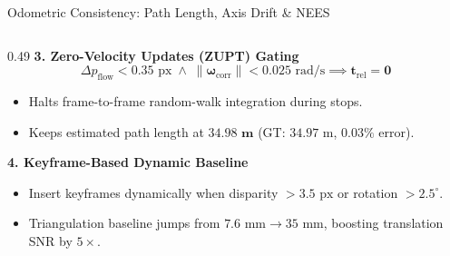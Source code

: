 \documentclass[aspectratio=169, 10pt]{beamer}
\begin{document}
\begin{frame}{Odometric Consistency: Path Length, Axis Drift \& NEES}
\begin{columns}[T]
    \begin{column}{0.49\textwidth}
      {\small \textbf{\textcolor{NavyBlue}{3. Zero-Velocity Updates (ZUPT) Gating}}}
      \vspace{0.05cm}
      \begin{equation}
        \Delta p_{\text{flow}} < 0.35\text{ px} \;\wedge\; \|\boldsymbol{\omega}_{\text{corr}}\| < 0.025\text{ rad/s} \implies \mathbf{t}_{\text{rel}} = \mathbf{0}
      \end{equation}
      \scriptsize
      \begin{itemize}
        \setlength{\itemsep}{1pt}
        \item Halts frame-to-frame random-walk integration during stops.
        \item Keeps estimated path length at $\mathbf{34.98\text{ m}}$ (GT: $34.97\text{ m}$, $0.03\%$ error).
      \end{itemize}

      \vspace{0.06cm}
      {\small \textbf{\textcolor{NavyBlue}{4. Keyframe-Based Dynamic Baseline}}}
      \vspace{0.05cm}
      \scriptsize
      \begin{itemize}
        \setlength{\itemsep}{1pt}
        \item Insert keyframes dynamically when disparity $> 3.5\text{ px}$ or rotation $> 2.5^\circ$.
        \item Triangulation baseline jumps from $7.6\text{ mm} \rightarrow 35\text{ mm}$, boosting translation SNR by $5\times$.
      \end{itemize}
    \end{column}
  \end{columns}
\end{frame}
\end{document}

